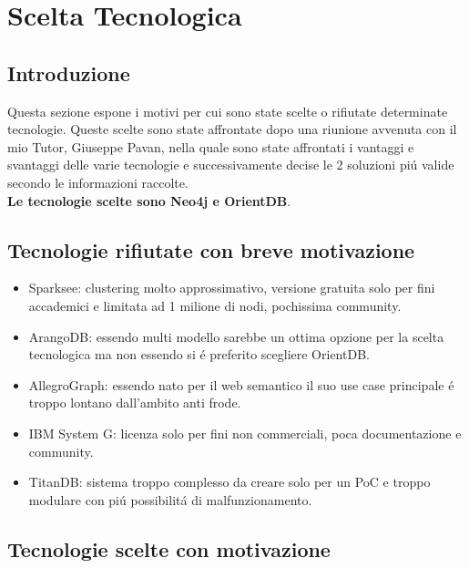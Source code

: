 \section{Scelta Tecnologica}
\subsection{Introduzione}
Questa sezione espone i motivi per cui sono state scelte o rifiutate determinate tecnologie. Queste scelte sono state affrontate dopo una riunione avvenuta con il mio Tutor, Giuseppe Pavan, nella quale sono state affrontati i vantaggi e svantaggi delle varie tecnologie e successivamente decise le 2 soluzioni pi\'u valide secondo le informazioni raccolte.\\
\textbf{Le tecnologie scelte sono Neo4j e OrientDB}.

\subsection{Tecnologie rifiutate con breve motivazione}
\begin{itemize}
\item{Sparksee:} clustering molto approssimativo, versione gratuita solo per fini accademici e limitata ad 1 milione di nodi, pochissima community.
\item{ArangoDB:} essendo multi modello sarebbe un ottima opzione per la scelta tecnologica ma non essendo  si \'e preferito scegliere OrientDB.
\item{AllegroGraph:} essendo nato per il web semantico il suo use case principale \'e troppo lontano dall'ambito anti frode.
\item{IBM System G:} licenza solo per fini non commerciali, poca documentazione e community.
\item{TitanDB:} sistema troppo complesso da creare solo per un PoC e troppo modulare con pi\'u possibilit\'a di malfunzionamento.
\end{itemize}

\subsection{Tecnologie scelte con motivazione}

